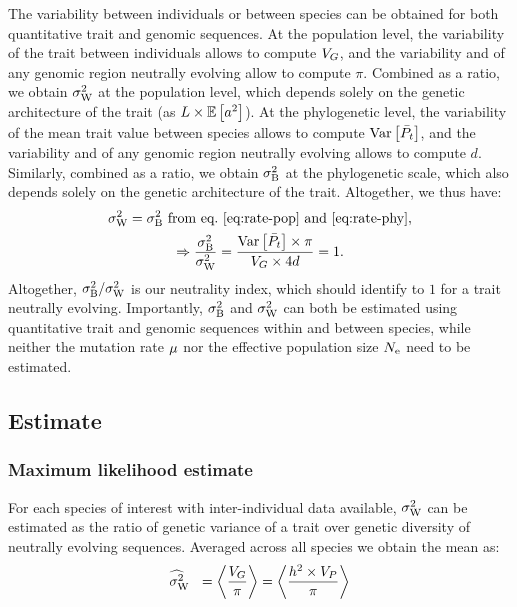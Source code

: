 \documentclass{article}
\begin{document}
 The variability between individuals or between species can be obtained for both quantitative trait and genomic sequences.
 At the population level, the variability of the trait between individuals allows to compute $V_{G}$, and the variability and of any genomic region neutrally evolving allow to compute $\pi$.
Combined as a ratio, we obtain $\sigma^2_{\text{W}}$ at the population level, which depends solely on the genetic architecture of the trait (as $L \times \operatorname{\mathbb{E}} \left[ a^2 \right]$).
At the phylogenetic level, the variability of the mean trait value between species allows to compute $\operatorname{\text{Var}} \left[\bar{P_{t}}\right]$, and the variability and of any genomic region neutrally evolving allows to compute $d$.
Similarly, combined as a ratio, we obtain $\sigma^2_{\text{B}}$ at the phylogenetic scale, which also depends solely on the genetic architecture of the trait.
Altogether, we thus have:
\begin{gather}
    \sigma^2_{\text{W}} = \sigma^2_{\text{B}} \text{ from eq.~\ref{eq:rate-pop} and~\ref{eq:rate-phy}} , \\
    \Rightarrow \frac{\sigma^2_{\text{B}}}{\sigma^2_{\text{W}}} = \frac{\operatorname{\text{Var}} \left[\bar{P_{t}}\right] \times \pi}{ V_{G} \times 4 d }  = 1.
\end{gather}
Altogether, $\sigma^2_{\text{B}} / \sigma^2_{\text{W}}$ is our neutrality index, which should identify to $1$ for a trait neutrally evolving.
Importantly, $\sigma^2_{\text{B}}$ and $\sigma^2_{\text{W}}$ can both be estimated using quantitative trait and genomic sequences within and between species, while neither the mutation rate $\mu$ nor the effective population size $N_{\text{e}}$ need to be estimated.

\subsection{Estimate}

\subsubsection{Maximum likelihood estimate}
For each species of interest with inter-individual data available, $\sigma^2_{\text{W}}$ can be estimated as the ratio of genetic variance of a trait over genetic diversity of neutrally evolving sequences.
Averaged across all species we obtain the mean as:
\begin{gather}
    \EstRatePop = \left< \frac{\VarGenetic}{\pi} \right> = \left< \frac{h^2 \Multiply \VarPhenotype }{\pi } \right> \label{eq:estimated-rate-pop}
\end{gather}
\end{document}
